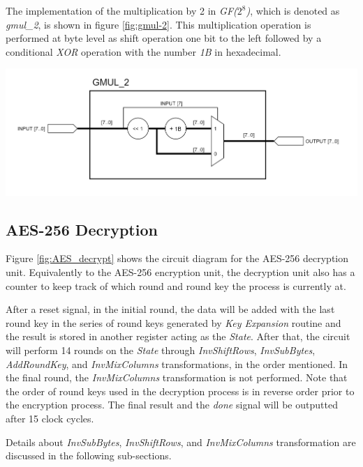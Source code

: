\documentclass[a4paper, 10pt]{article}
\newenvironment{Figure}
    {\par\medskip\noindent\minipage{\linewidth}}
    {\endminipage\par\medskip}
\begin{document}
\begin{multicols}{2}
            The implementation of the multiplication by 2 in \textit{GF($2^{8}$)}, which is denoted as \textit{gmul\_2}, is shown in figure \ref{fig:gmul-2}. This multiplication operation is performed at byte level as shift operation one bit to the left followed by a conditional \textit{XOR} operation with the number \textit{1B} in hexadecimal.

            \noindent
            \begin{Figure}
                \centering
                \includegraphics[width=\linewidth]{gmul_2.png}
                \label{fig:gmul-2}
            \end{Figure}

            \subsection{AES-256 Decryption}

	Figure \ref{fig:AES_decrypt} shows the circuit diagram for the AES-256 decryption unit. Equivalently to the AES-256 encryption unit, the decryption unit also has a counter to keep track of which round and round key the process is currently at.

	After a reset signal, in the initial round, the data will be added with the last round key in the series of round keys generated by \textit{Key Expansion} routine and the result is stored in another register acting as the \textit{State}. After that, the circuit will perform 14 rounds on the \textit{State} through \textit{InvShiftRows}, \textit{InvSubBytes}, \textit{AddRoundKey}, and \textit{InvMixColumns} transformations, in the order mentioned. In the final round, the \textit{InvMixColumns} transformation is not performed. Note that the order of round keys used in the decryption process is in reverse order prior to the encryption process. The final result and the \textit{done} signal will be outputted after 15 clock cycles.

	Details about \textit{InvSubBytes}, \textit{InvShiftRows}, and \textit{InvMixColumns} transformation are discussed in the following sub-sections.


\end{multicols}
\end{document}
